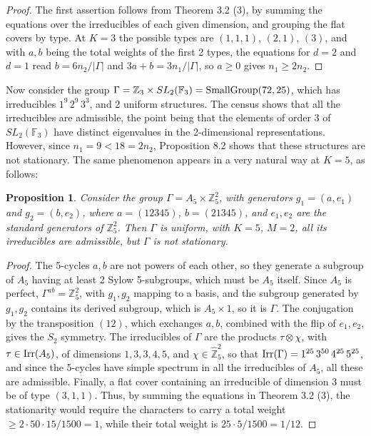 \documentclass[12pt]{amsart}
\newtheorem{proposition}[theorem]{Proposition}
\theoremstyle{definition}
\begin{document}
\begin{proof}
The first assertion follows from Theorem 3.2 (3), by summing the equations over the irreducibles of each given dimension, and grouping the flat covers by type. At $K=3$ the possible types are $(1,1,1)$, $(2,1)$, $(3)$, and with $a,b$ being the total weights of the first 2 types, the equations for $d=2$ and $d=1$ read $b=6n_2/|\Gamma|$ and $3a+b=3n_1/|\Gamma|$, so $a\geq0$ gives $n_1\geq2n_2$.
\end{proof}

Now consider the group $\Gamma=\mathbb Z_3\times SL_2(\mathbb F_3)={\rm SmallGroup}(72,25)$, which has irreducibles $1^9\,2^9\,3^3$, and 2 uniform structures. The census shows that all the irreducibles are admissible, the point being that the elements of order 3 of $SL_2(\mathbb F_3)$ have distinct eigenvalues in the 2-dimensional representations. However, since $n_1=9<18=2n_2$, Proposition 8.2 shows that these structures are not stationary. The same phenomenon appears in a very natural way at $K=5$, as follows:

\begin{proposition}
Consider the group $\Gamma=A_5\times\mathbb Z_5^2$, with generators $g_1=(a,e_1)$ and $g_2=(b,e_2)$, where $a=(12345)$, $b=(21345)$, and $e_1,e_2$ are the standard generators of $\mathbb Z_5^2$. Then $\Gamma$ is uniform, with $K=5$, $M=2$, all its irreducibles are admissible, but $\Gamma$ is not stationary.
\end{proposition}

\begin{proof}
The 5-cycles $a,b$ are not powers of each other, so they generate a subgroup of $A_5$ having at least 2 Sylow 5-subgroups, which must be $A_5$ itself. Since $A_5$ is perfect, $\Gamma^{ab}=\mathbb Z_5^2$, with $g_1,g_2$ mapping to a basis, and the subgroup generated by $g_1,g_2$ contains its derived subgroup, which is $A_5\times1$, so it is $\Gamma$. The conjugation by the transposition $(12)$, which exchanges $a,b$, combined with the flip of $e_1,e_2$, gives the $S_2$ symmetry. The irreducibles of $\Gamma$ are the products $\tau\otimes\chi$, with $\tau\in{\rm Irr}(A_5)$, of dimensions $1,3,3,4,5$, and $\chi\in\widehat{\mathbb Z}_5^2$, so that ${\rm Irr}(\Gamma)=1^{25}\,3^{50}\,4^{25}\,5^{25}$, and since the 5-cycles have simple spectrum in all the irreducibles of $A_5$, all these are admissible. Finally, a flat cover containing an irreducible of dimension 3 must be of type $(3,1,1)$. Thus, by summing the equations in Theorem 3.2 (3), the stationarity would require the characters to carry a total weight $\geq2\cdot50\cdot15/1500=1$, while their total weight is $25\cdot5/1500=1/12$.
\end{proof}
\end{document}
